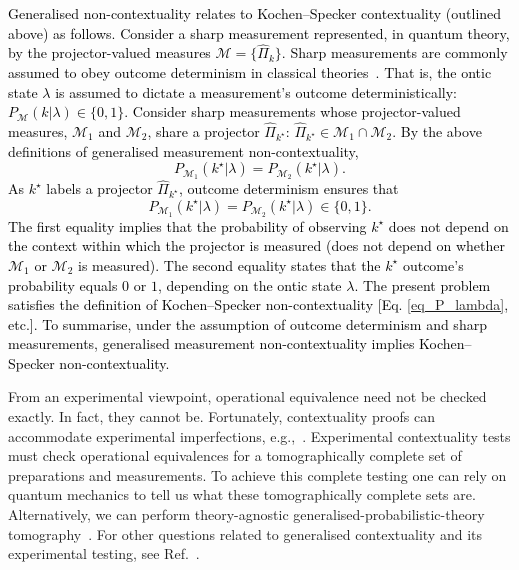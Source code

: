 \documentclass[%
 reprint,
superscriptaddress,
nofootinbib,
bibnotes,
 amsmath,amssymb,
 aps,
]{revtex4-1}
\theoremstyle{plain}
\newcommand{\Dave}[1]{\textcolor{black}{#1} }
\newcommand{\nicole}[1]{\textcolor{black}{#1} }
\begin{document}
\nicole{
Generalised non-contextuality relates to Kochen--Specker contextuality (outlined above) as follows.  Consider a sharp measurement represented, in quantum theory, by the projector-valued measures 
$\mathcal{M} = \{ \hat{\Pi}_k \}$.  
\nicole{Sharp measurements are commonly assumed to obey outcome determinism in classical theories~\cite{spekkens2005contextuality}. That is, the ontic state $\lambda$ is assumed to dictate a measurement's outcome deterministically:}
$P_{\mathcal{M}}(k|\lambda)  \in \{ 0,1\}$.  
Consider sharp measurements whose projector-valued measures, $\mathcal{M}_1$ and $\mathcal{M}_2$, share a projector $\hat{\Pi}_{k^{\star}}$: 
$\hat{\Pi}_{k^{\star}} \in  \mathcal{M}_1 \cap \mathcal{M}_2$.  
By the above definitions of generalised measurement non-contextuality, 
\begin{equation}
P_{\mathcal{M}_1}(k^{\star}|\lambda) = P_{\mathcal{M}_2}(k^{\star}|\lambda) .
\end{equation}
As $k^{\star}$ labels a projector $\hat{\Pi}_{k^{\star}}$,  outcome determinism ensures that \cite{Lostaglio_quantum_2018}
\begin{equation}
P_{\mathcal{M}_1}(k^{\star}|\lambda) = P_{\mathcal{M}_2}(k^{\star}|\lambda) \in \{ 0, 1\} .
\end{equation}
The first equality implies that the probability of observing $k^{\star}$ does not depend on the context within which the projector is measured (does not depend on whether $\mathcal{M}_1$ or $\mathcal{M}_2$ is measured).   The second equality states that the $k^\star$ outcome's probability equals $0$ or $1$, depending on the ontic state $\lambda$.  
The present problem satisfies the definition of Kochen--Specker non-contextuality \Dave{[Eq. \eqref{eq_P_lambda},  etc.].}
To summarise,  under the assumption of outcome determinism and sharp measurements,  generalised measurement non-contextuality implies Kochen--Specker non-contextuality. 
}


From an experimental viewpoint, operational equivalence need not be checked exactly. In fact, they cannot be.
Fortunately, contextuality proofs can accommodate experimental imperfections, e.g.,~\cite{schmid2018contextual, lostaglio2020contextual, kunjwal2019anomalous}. 
Experimental contextuality tests must 
check
operational equivalences for a tomographically complete set of preparations and measurements. To achieve this complete testing
one can  rely on quantum mechanics to tell us what these tomographically complete sets are. Alternatively, we can perform theory-agnostic generalised-probabilistic-theory tomography~\cite{mazurek2016experimental,mazurek2021experimentally}. For other questions related to generalised contextuality and its experimental testing, see Ref.~\cite{schmid2023addressing}. 
\end{document}
